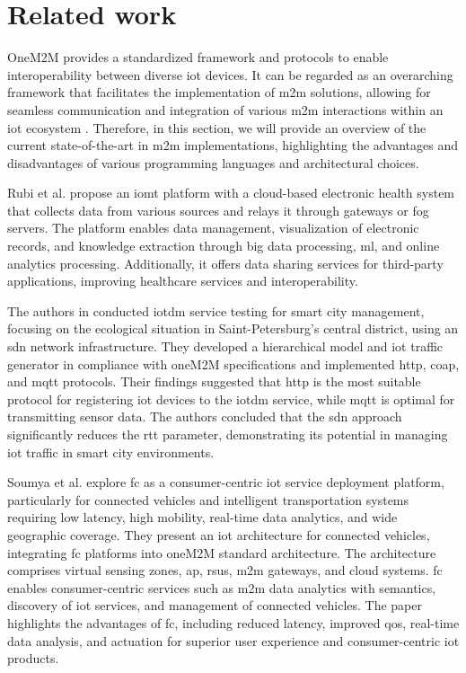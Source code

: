 \documentclass[a4paper,fleqn]{cas-dc}
\begin{document}
\section{Related work}
\label{relatedWork}

OneM2M provides a standardized framework and protocols to enable interoperability between diverse \gls{iot} devices. It can be regarded as an overarching framework that facilitates the implementation of \gls{m2m} solutions, allowing for seamless communication and integration of various \gls{m2m} interactions within an \gls{iot} ecosystem \cite{onem2m_standard}. Therefore, in this section, we will provide an overview of the current state-of-the-art in \gls{m2m} implementations, highlighting the advantages and disadvantages of various programming languages and architectural choices.

Rubi et al. \cite{Rubi2019} propose an \gls{iomt} platform with a cloud-based electronic health system that collects data from various sources and relays it through gateways or fog servers. The platform enables data management, visualization of electronic records, and knowledge extraction through big data processing, \gls{ml}, and online analytics processing. Additionally, it offers data sharing services for third-party applications, improving healthcare services and interoperability.

The authors in \cite{Volkov2017} conducted \gls{iotdm} service testing for smart city management, focusing on the ecological situation in Saint-Peters\-burg's central district, using an \gls{sdn} network infrastructure. They developed a hierarchical model and \gls{iot} traffic generator in compliance with oneM2M specifications and implemented \gls{http}, \gls{coap}, and \gls{mqtt} protocols. Their findings suggested that \gls{http} is the most suitable protocol for registering \gls{iot} devices to the \gls{iotdm} service, while \gls{mqtt} is optimal for transmitting sensor data. The authors concluded that the \gls{sdn} approach significantly reduces the \gls{rtt} parameter, demonstrating its potential in managing \gls{iot} traffic in smart city environments.

Soumya et al. \cite{Datta2015} explore \gls{fc} as a consumer-centric \gls{iot} service deployment platform, particularly for connected vehicles and intelligent transportation systems requiring low latency, high mobility, real-time data analytics, and wide geographic coverage. They present an \gls{iot} architecture for connected vehicles, integrating \gls{fc} platforms into oneM2M standard architecture. The architecture comprises virtual sensing zones, \gls{ap}, \gls{rsus}, \gls{m2m} gateways, and cloud systems. \gls{fc} enables consumer-centric services such as \gls{m2m} data analytics with semantics, discovery of \gls{iot} services, and management of connected vehicles. The paper highlights the advantages of \gls{fc}, including reduced latency, improved \gls{qos}, real-time data analysis, and actuation for superior user experience and consumer-centric \gls{iot} products.
\end{document}
